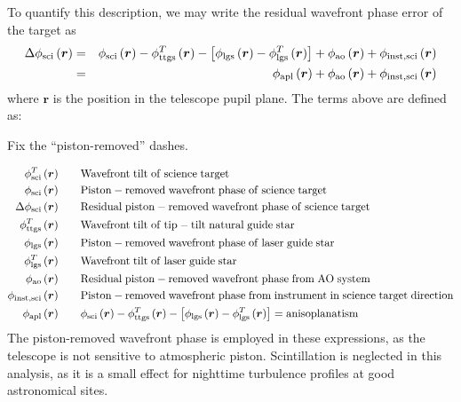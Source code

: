 To quantify this description, we may write the residual wavefront
phase error of the target as
\begin{eqnarray}\label{eqn:phdiff}
\Delta\phi_{\rm sci}\left(\boldsymbol{r}\right) & = & \phi_{\rm sci}\left(\boldsymbol{r}\right) - \phi^{T}_{\rm ttgs}\left(\boldsymbol{r}\right) - 
\left[\phi_{\rm lgs}\left(\boldsymbol{r}\right) - \phi^{T}_{\rm lgs}\left(\boldsymbol{r}\right)\right] + \phi_{\rm ao}\left(\boldsymbol{r}\right) + 
\phi_{\rm inst,sci}\left(\boldsymbol{r}\right) \\
& = & \phi_{\rm apl}\left(\boldsymbol{r}\right) + \phi_{\rm ao}\left(\boldsymbol{r}\right)  + \phi_{\rm inst,sci}\left(\boldsymbol{r}\right) \nonumber
\end{eqnarray}
where $\boldsymbol{r}$ is the position in the telescope pupil plane. 
The terms above are defined as: 
\begin{notes}
Fix the ``piston-removed'' dashes.
\end{notes}
\begin{equation}\label{eqn:phidefs}
\begin{aligned}
\phi^{T}_{\rm sci}\left(\boldsymbol{r}\right)  \quad & \quad  
{\rm Wavefront\; tilt\; of\; science\; target}  \\
\phi_{\rm sci}\left(\boldsymbol{r}\right)  \quad & \quad  
{\rm Piston-removed\; wavefront\; phase\; of\; science\; target}  \\
\Delta\phi_{\rm sci}\left(\boldsymbol{r}\right)  \quad & \quad  
{\rm Residual\; piston-removed\; wavefront\; phase\; of\; science\; target} \\
\phi^{T}_{\rm ttgs}\left(\boldsymbol{r}\right)  \quad & \quad  
{\rm Wavefront\; tilt\; of\; tip-tilt\; natural\; guide\; star}  \\
\phi_{\rm lgs}\left(\boldsymbol{r}\right)  \quad & \quad  
{\rm Piston-removed\; wavefront\; phase\; of\; laser\; guide\; star}  \\
\phi^{T}_{\rm lgs}\left(\boldsymbol{r}\right)  \quad & \quad  
{\rm Wavefront\; tilt\; of\; laser\; guide\; star}  \\
\phi_{\rm ao}\left(\boldsymbol{r}\right)  \quad & \quad  
{\rm Residual\; piston-removed\; wavefront\; phase\; from\; AO\; system}  \\
\phi_{\rm inst,sci}\left(\boldsymbol{r}\right)  \quad & \quad  
{\rm Piston-removed\; wavefront\; phase\; from\; instrument\; in\; science\; target\; direction}  \\
\phi_{\rm apl}\left(\boldsymbol{r}\right)  \quad & \quad  \phi_{\rm sci}\left(\boldsymbol{r}\right) - \phi^{T}_{\rm ttgs}\left(\boldsymbol{r}\right) - 
\left[\phi_{\rm lgs}\left(\boldsymbol{r}\right) - \phi^{T}_{\rm lgs}\left(\boldsymbol{r}\right)\right] = 
{\rm anisoplanatism}
\end{aligned}
\end{equation}
The piston-removed wavefront phase is
employed in these expressions, as the telescope is not sensitive to
atmospheric piston.  Scintillation is neglected in this analysis, as
it is a small effect for nighttime turbulence profiles at good
astronomical sites.

